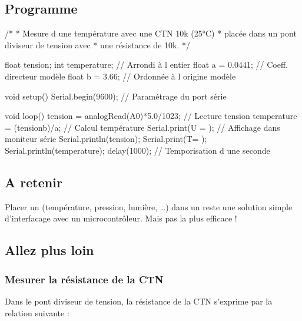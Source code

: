 \documentclass[a4paper,10pt,french]{book}
\begin{document}
\subsection{Programme}
\label{\detokenize{4_lycee/1_seconde_ctn:programme}}
\begin{sphinxVerbatim}[commandchars=\\\{\}]
/*
 * Mesure d une température avec une CTN 10k (25°C)
 * placée dans un pont diviseur de tension avec
 * une résistance de 10k.
 */

float tension;
int temperature;    // Arrondi à l entier
float a = \PYGZhy{}0.0441;  // Coeff. directeur modèle
float b = 3.66;     // Ordonnée à l origine modèle

void setup() \PYGZob{}
  Serial.begin(9600);  // Paramétrage du port série

\PYGZcb{}

void loop() \PYGZob{}
  tension = analogRead(A0)*5.0/1023; // Lecture tension
  temperature = (tension\PYGZhy{}b)/a;       // Calcul température
  Serial.print(\PYGZdq{}U = \PYGZdq{});              // Affichage dans moniteur série
  Serial.println(tension);
  Serial.print(\PYGZdq{}T= \PYGZdq{});
  Serial.println(temperature);
  delay(1000);                       // Temporisation d une seconde
\PYGZcb{}
\end{sphinxVerbatim}


\subsection{A retenir}
\label{\detokenize{4_lycee/1_seconde_ctn:a-retenir}}
Placer un  (température, pression, lumière, …) dans un  reste une solution simple d’interfacage avec un microcontrôleur. Mais pas la plus efficace !


\subsection{Allez plus loin}
\label{\detokenize{4_lycee/1_seconde_ctn:allez-plus-loin}}

\subsubsection{Mesurer la résistance de la CTN}
\label{\detokenize{4_lycee/1_seconde_ctn:mesurer-la-resistance-de-la-ctn}}
Dans le pont diviseur de tension, la résistance de la CTN s’exprime par la relation suivante :
\end{document}
